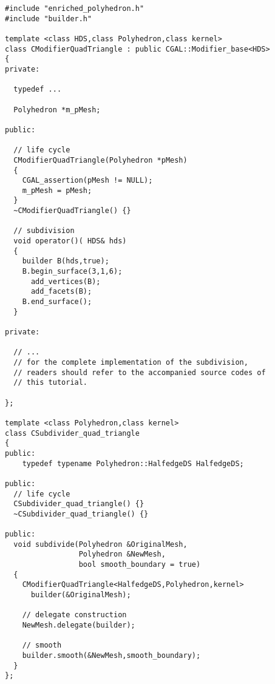 \begin{lstlisting}
#include "enriched_polyhedron.h"
#include "builder.h"

template <class HDS,class Polyhedron,class kernel>
class CModifierQuadTriangle : public CGAL::Modifier_base<HDS>
{
private:

  typedef ...

  Polyhedron *m_pMesh;

public:

  // life cycle
  CModifierQuadTriangle(Polyhedron *pMesh)
  {
    CGAL_assertion(pMesh != NULL);
    m_pMesh = pMesh;
  }
  ~CModifierQuadTriangle() {}

  // subdivision
  void operator()( HDS& hds)
  {
    builder B(hds,true);
    B.begin_surface(3,1,6);
      add_vertices(B);
      add_facets(B);
    B.end_surface();
  }

private:

  // ... 
  // for the complete implementation of the subdivision, 
  // readers should refer to the accompanied source codes of 
  // this tutorial.
  
};

template <class Polyhedron,class kernel>
class CSubdivider_quad_triangle
{
public:
    typedef typename Polyhedron::HalfedgeDS HalfedgeDS;

public:
  // life cycle
  CSubdivider_quad_triangle() {}
  ~CSubdivider_quad_triangle() {}

public:
  void subdivide(Polyhedron &OriginalMesh,
                 Polyhedron &NewMesh,
                 bool smooth_boundary = true)
  {
    CModifierQuadTriangle<HalfedgeDS,Polyhedron,kernel> 
      builder(&OriginalMesh);

    // delegate construction 
    NewMesh.delegate(builder);

    // smooth
    builder.smooth(&NewMesh,smooth_boundary);
  }
};
\end{lstlisting}

